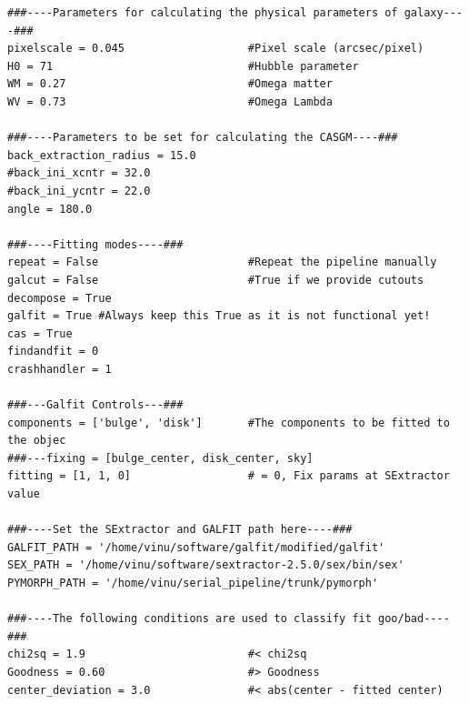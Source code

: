 \documentclass[a4paper,10pt]{article}
\begin{document}
\begin{footnotesize}
\begin{verbatim}
###----Parameters for calculating the physical parameters of galaxy----###
pixelscale = 0.045                   #Pixel scale (arcsec/pixel)
H0 = 71                              #Hubble parameter
WM = 0.27                            #Omega matter
WV = 0.73                            #Omega Lambda

###----Parameters to be set for calculating the CASGM----###
back_extraction_radius = 15.0
#back_ini_xcntr = 32.0 
#back_ini_ycntr = 22.0
angle = 180.0

###----Fitting modes----###
repeat = False                       #Repeat the pipeline manually
galcut = False                       #True if we provide cutouts
decompose = True
galfit = True #Always keep this True as it is not functional yet!
cas = True
findandfit = 0
crashhandler = 1

###---Galfit Controls---###
components = ['bulge', 'disk']       #The components to be fitted to the objec
###---fixing = [bulge_center, disk_center, sky]
fitting = [1, 1, 0]                  # = 0, Fix params at SExtractor value

###----Set the SExtractor and GALFIT path here----###
GALFIT_PATH = '/home/vinu/software/galfit/modified/galfit' 
SEX_PATH = '/home/vinu/software/sextractor-2.5.0/sex/bin/sex'
PYMORPH_PATH = '/home/vinu/serial_pipeline/trunk/pymorph'

###----The following conditions are used to classify fit goo/bad----###
chi2sq = 1.9                         #< chi2sq
Goodness = 0.60                      #> Goodness
center_deviation = 3.0               #< abs(center - fitted center)
\end{verbatim}
\end{footnotesize}
\end{document}

